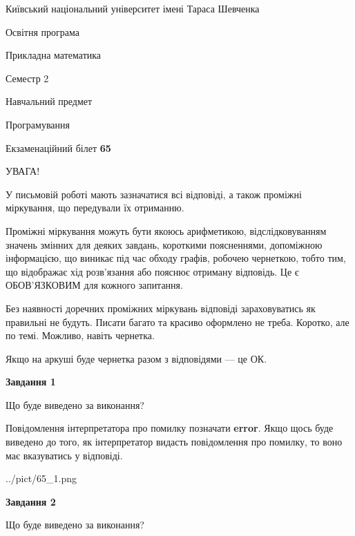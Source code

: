 \documentclass[12pt, ukrainian]{article}
\begin{document}
{{\begin {small}\par
{ \center  Київський національний університет імені Тараса Шевченка \par}
{\parbox {5 cm}{Освітня програма \hfill}{\parbox {7 cm}{Прикладна математика \hfill}}\parbox {6 cm}{\hfill Семестр 2}}\par
{\parbox {5 cm} {Навчальний предмет \hfill}\parbox {7 cm}{Програмування \hfill}\parbox {6cm}{\hfill}\par}\vspace{-7pt} \end{small}}{\center Екзаменаційний білет \No \textbf
{ 65 }\par}}
{
\begin {large}
УВАГА!

У письмовій роботі мають зазначатися всі відповіді, а також проміжні міркування, що передували їх отриманню.

Проміжні міркування можуть бути якоюсь арифметикою, відслідковуванням зна\-чень змінних для деяких завдань,
короткими поясненнями, допоміжною інформацією, що виникає під час обходу графів, робочею чернеткою,
тобто тим, що відображає хід розв’язання або пояснює отриману відповідь.
Це є ОБОВ’ЯЗКОВИМ для кожного запитання.

Без наявності доречних проміжних міркувань відповіді зараховуватись як правиль\-ні не будуть.
Писати багато та красиво оформлено не треба. Коротко, але по темі. Можли\-во, навіть чернетка.

Якщо на аркуші буде чернетка разом з відповідями --- це ОК.

\newpage

{\begin {center}\textbf{Завдання 1}\end {center}}\par
Що буде виведено за виконання?

Повідомлення інтерпретатора про помилку позначати \textbf{error}.
Якщо щось буде виведено до того, як інтерпретатор видасть повідомлення про помилку, 
то воно має вказуватись у відповіді. \par


\begin{center}
	{../pict/65_1.png}
\end{center}
\newpage

{\begin {center}\textbf{Завдання 2}\end {center}}\par
Що буде виведено за виконання?


\end{large}}
\end{document}
